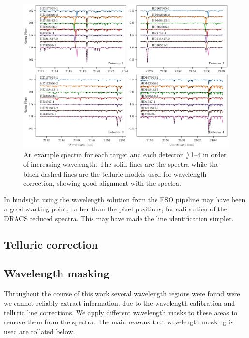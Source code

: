 \begin{figure}
    \centering
    \includegraphics[width=1\linewidth]{figures/reduction/Spectra_examples}
    \caption{An example spectra for each target and each detector \#1--4 in order of increasing wavelength.
The solid lines are the spectra while the black dashed lines are the telluric models used for wavelength correction, showing good alignment with the spectra.}
    \label{fig:spectraexamples}
\end{figure}




In hindsight using the wavelength solution from the {ESO} pipeline may have been a good starting point, rather than the pixel positions, for calibration of the {DRACS} reduced spectra.
This may have made the line identification simpler.


\subsection{Telluric correction}



\subsection{Wavelength masking}
Throughout the course of this work several wavelength regions were found were we cannot reliably extract information, due to the wavelength calibration and telluric line corrections.
We apply different wavelength masks to these areas to remove them from the spectra.
The main reasons that wavelength masking is used are collated below.

